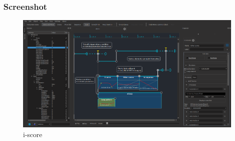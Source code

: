 \documentclass{beamer}
\begin{document}
\begin{frame}
    \frametitle{Screenshot}    
    \begin{figure}
    	\centering
    	\includegraphics[width=\textwidth]{images/iscore.png}
    	\caption{i-score}
    \end{figure}    
\end{frame}
\end{document}
